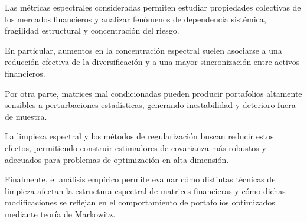 \documentclass[letterpaper,12pt,oneside]{book}
\begin{document}
Las métricas espectrales consideradas permiten estudiar propiedades colectivas de los mercados financieros y analizar fenómenos de dependencia sistémica, fragilidad estructural y concentración del riesgo.

En particular, aumentos en la concentración espectral suelen asociarse a una reducción efectiva de la diversificación y a una mayor sincronización entre activos financieros.

Por otra parte, matrices mal condicionadas pueden producir portafolios altamente sensibles a perturbaciones estadísticas, generando inestabilidad y deterioro fuera de muestra.

La limpieza espectral y los métodos de regularización buscan reducir estos efectos, permitiendo construir estimadores de covarianza más robustos y adecuados para problemas de optimización en alta dimensión.

Finalmente, el análisis empírico permite evaluar cómo distintas técnicas de limpieza afectan la estructura espectral de matrices financieras y cómo dichas modificaciones se reflejan en el comportamiento de portafolios optimizados mediante teoría de Markowitz.





%
%
\end{document}
